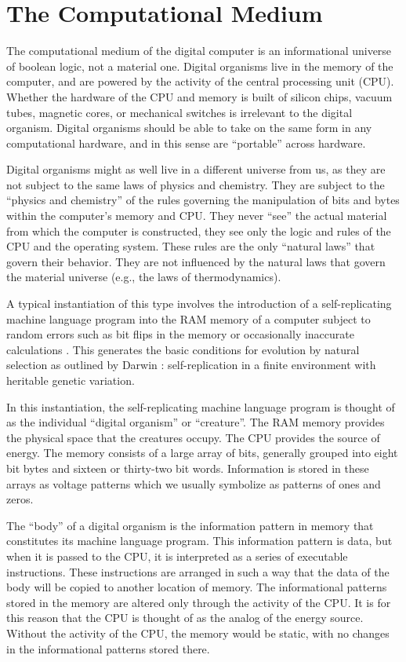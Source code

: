 \section{The Computational Medium}

The computational medium of the digital computer is an informational
universe of boolean logic, not a material one.  Digital organisms live
in the memory of the computer, and are powered by the activity of the
central processing unit (CPU).  Whether the hardware of the CPU and
memory is built of silicon chips, vacuum tubes, magnetic cores, or
mechanical switches is irrelevant to the digital organism.  Digital
organisms should be able to take on the same form in any computational
hardware, and in this sense are ``portable'' across hardware.

Digital organisms might as well live in a different universe from
us, as they are not subject to the same laws of physics and chemistry.
They are subject to the ``physics and chemistry'' of the rules governing
the manipulation of bits and bytes within the computer's memory and CPU.
They never ``see'' the actual material from which the computer is
constructed, they see only the logic and rules of the CPU and the
operating system.  These rules are the only ``natural laws'' that
govern their behavior.  They are not influenced by the natural laws
that govern the material universe (e.g., the laws of thermodynamics).

A typical instantiation of this type involves the introduction of a
self-replicating machine language program into the RAM memory of a
computer subject to random errors such as bit flips in the memory or
occasionally inaccurate calculations \cite{BaDa,Broo,DeGr,Male,Ray91a}.
This generates the basic conditions
for evolution by natural selection as outlined by Darwin \cite{Darw59}:
self-replication in a finite environment with heritable genetic variation.

In this instantiation, the self-replicating machine language program
is thought of as the individual ``digital organism'' or ``creature''.
The RAM memory provides the physical space that the creatures occupy.  The
CPU provides the source of energy.  The memory consists of a large array
of bits, generally grouped into eight bit bytes and sixteen or thirty-two
bit words.  Information is stored in these arrays as voltage patterns
which we usually symbolize as patterns of ones and zeros.

The ``body'' of a digital organism is the information pattern in memory
that constitutes its machine language program.  This information pattern
is data, but when it is passed to the CPU, it is interpreted as a series of
executable instructions.  These instructions are arranged in such a way
that the data of the body will be copied to another location of memory.
The informational patterns stored in the memory are altered only through
the activity of the CPU.  It is for this reason that the CPU is thought
of as the analog of the energy source.  Without the activity of the CPU,
the memory would be static, with no changes in the informational patterns
stored there.

